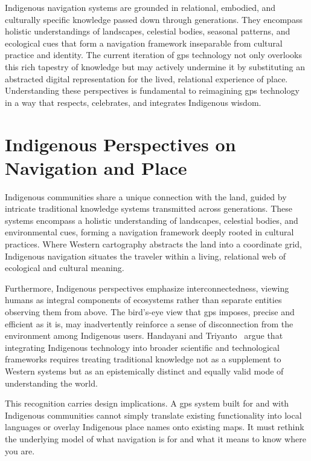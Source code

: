 \documentclass[11pt,showkeys]{essay}
\begin{document}
Indigenous navigation systems are grounded in relational, embodied, and culturally specific knowledge passed down through generations. They encompass holistic understandings of landscapes, celestial bodies, seasonal patterns, and ecological cues that form a navigation framework inseparable from cultural practice and identity. The current iteration of \gls{gps} technology not only overlooks this rich tapestry of knowledge but may actively undermine it by substituting an abstracted digital representation for the lived, relational experience of place. Understanding these perspectives is fundamental to reimagining \gls{gps} technology in a way that respects, celebrates, and integrates Indigenous wisdom.

\section{Indigenous Perspectives on Navigation and Place}

Indigenous communities share a unique connection with the land, guided by intricate traditional knowledge systems transmitted across generations. These systems encompass a holistic understanding of landscapes, celestial bodies, and environmental cues, forming a navigation framework deeply rooted in cultural practices. Where Western cartography abstracts the land into a coordinate grid, Indigenous navigation situates the traveler within a living, relational web of ecological and cultural meaning.

Furthermore, Indigenous perspectives emphasize interconnectedness, viewing humans as integral components of ecosystems rather than separate entities observing them from above. The bird's-eye view that \gls{gps} imposes, precise and efficient as it is, may inadvertently reinforce a sense of disconnection from the environment among Indigenous users. Handayani and Triyanto~\cite{handayani_integrating_2023} argue that integrating Indigenous technology into broader scientific and technological frameworks requires treating traditional knowledge not as a supplement to Western systems but as an epistemically distinct and equally valid mode of understanding the world.

This recognition carries design implications. A \gls{gps} system built for and with Indigenous communities cannot simply translate existing functionality into local languages or overlay Indigenous place names onto existing maps. It must rethink the underlying model of what navigation is for and what it means to know where you are.
\end{document}
